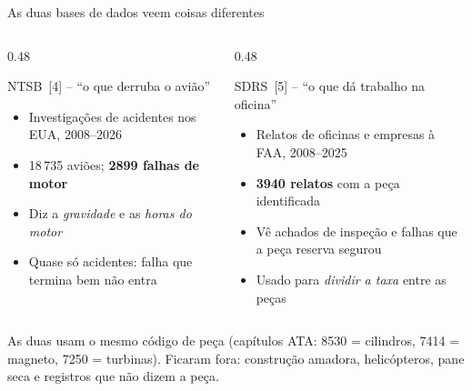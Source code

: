 \documentclass[aspectratio=169,11pt]{beamer}
\newcommand{\destaque}[1]{{\color{ieeeblue}\bfseries #1}}
\begin{document}
\begin{frame}{As duas bases de dados veem coisas diferentes}
  \begin{columns}[T]
    \begin{column}{0.48\textwidth}
      \begin{block}{NTSB~[4] \;--\; ``o que derruba o avião''}
        \small
        \begin{itemize}
          \item Investigações de acidentes nos EUA, 2008--2026
          \item 18\,735 aviões; \destaque{2899 falhas de motor}
          \item Diz a \emph{gravidade} e as \emph{horas do motor}
          \item Quase só acidentes: falha que termina bem não entra
        \end{itemize}
      \end{block}
    \end{column}
    \begin{column}{0.48\textwidth}
      \begin{block}{SDRS~[5] \;--\; ``o que dá trabalho na oficina''}
        \small
        \begin{itemize}
          \item Relatos de oficinas e empresas à FAA, 2008--2025
          \item \destaque{3940 relatos} com a peça identificada
          \item Vê achados de inspeção e falhas que a peça reserva segurou
          \item Usado para \emph{dividir a taxa} entre as peças
        \end{itemize}
      \end{block}
    \end{column}
  \end{columns}
  \vspace{2mm}
  {\small As duas usam o mesmo código de peça (capítulos ATA: 8530 = cilindros, 7414 = magneto, 7250 = turbinas). Ficaram fora: construção amadora, helicópteros, pane seca e registros que não dizem a peça.\par}
\end{frame}
\end{document}
